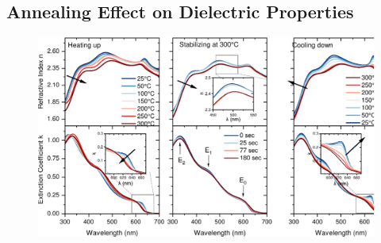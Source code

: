 \subsection{Annealing Effect on Dielectric Properties}


\begin{figure}
  \centering
  \medskip
  \includegraphics[width=.99\textwidth]{chapters/ellipsometry/image/Optical_constants.pdf}
  \caption{}
  \label{fig:ellipsometry:optical_constants}
\end{figure}



